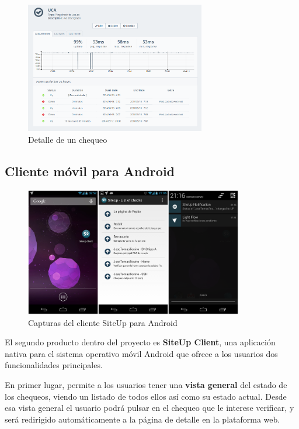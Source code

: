 \documentclass[a4paper,12pt]{article}
\begin{document}
\begin{figure}[h]
  \centering
  \includegraphics[width=0.7\textwidth]{detalle_chequeo}
  \caption{Detalle de un chequeo}
  \label{fig:detalle_chequeo}
\end{figure}

\subsection{Cliente móvil para Android}

\begin{figure}[hbt]
  \centering
  \includegraphics[width=0.85\textwidth]{capturas_android}
  \caption{Capturas del cliente SiteUp para Android}
  \label{fig:cliente_android}
\end{figure}

El segundo producto dentro del proyecto es \textbf{SiteUp Client}, una
aplicación nativa para el sistema operativo móvil Android que ofrece a los
usuarios dos funcionalidades principales.

En primer lugar, permite a los usuarios tener una \textbf{vista general} del
estado de los chequeos, viendo un listado de todos ellos así como su estado
actual. Desde esa vista general el usuario podrá pulsar en el chequeo que le
interese verificar, y será redirigido automáticamente a la página de detalle en
la plataforma web.
\end{document}
